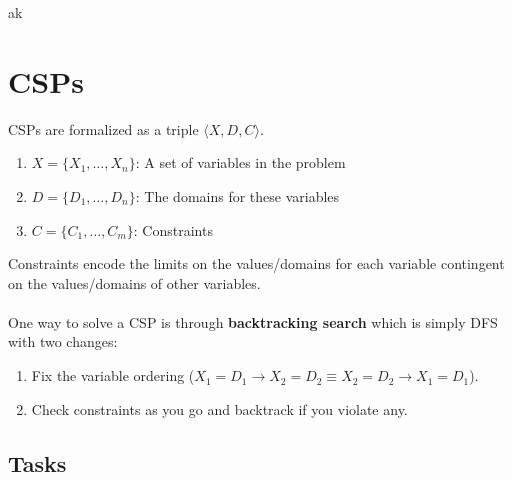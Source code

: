\documentclass[a4paper]{article}
\begin{document}
ak

\section*{CSPs}
CSPs are formalized as a triple $\langle X,D,C \rangle$. 
\begin{enumerate}
\item $X = \{X_1, \ldots, X_n\}$: A set of variables in the problem
\item $D = \{D_1, \ldots, D_n\}$: The domains for these variables
\item $C = \{C_1, \ldots, C_m\}$: Constraints
\end{enumerate}
Constraints encode the limits on the values/domains for each variable contingent on the values/domains of other variables.
\\ \\
\noindent One way to solve a CSP is through \textbf{backtracking search} which is simply DFS with two changes:
\begin{enumerate}
\item Fix the variable ordering ($X_1 = D_1 \rightarrow X_2 = D_2 \equiv X_2 = D_2 \rightarrow X_1 = D_1$).
\item Check constraints as you go and backtrack if you violate any.
\end{enumerate}

\subsection*{Tasks}
\end{document}
